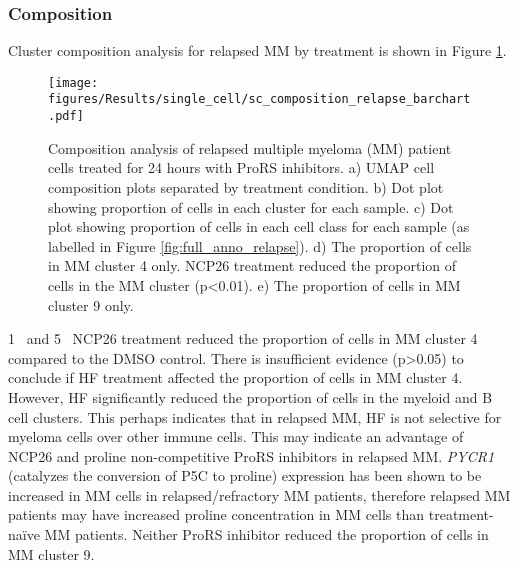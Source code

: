 \subsubsection{Composition}
Cluster composition analysis for relapsed MM by treatment is shown in Figure \ref{fig:composition_relapse}.
\begin{figure}[htb]
\centering
\texttt{[image: figures/Results/single\_cell/sc\_composition\_relapse\_barchart.pdf]}
\caption[Composition analysis- relapsed MM]{Composition analysis of relapsed multiple myeloma (MM) patient cells treated for 24 hours with ProRS inhibitors.
    a) UMAP cell composition plots separated by treatment condition.
    b) Dot plot showing proportion of cells in each cluster for each sample.
    c) Dot plot showing proportion of cells in each cell class for each sample (as labelled in Figure \ref{fig:full_anno_relapse}).
    d) The proportion of cells in MM cluster 4 only.
NCP26 treatment reduced the proportion of cells in the MM cluster (p<0.01).
    e) The proportion of cells in MM cluster 9 only.}
\label{fig:composition_relapse}
\end{figure}
1\si{\micro\Molar} and 5\si{\micro\Molar} NCP26 treatment reduced the proportion of cells in MM cluster 4 compared to the DMSO control.
There is insufficient evidence (p>0.05) to conclude if HF treatment affected the proportion of cells in MM cluster 4.
However, HF significantly reduced the proportion of cells in the myeloid and B cell clusters.
This perhaps indicates that in relapsed MM, HF is not selective for myeloma cells over other immune cells.
This may indicate an advantage of NCP26 and proline non-competitive ProRS inhibitors in relapsed MM\@.
\textit{PYCR1} (catalyzes the conversion of P5C to proline) expression has been shown to be increased in MM cells in relapsed/refractory MM patients\cite{oudaert2022pyrroline}, therefore relapsed MM patients may have increased proline concentration in MM cells than treatment-na\"ive MM patients.
Neither ProRS inhibitor reduced the proportion of cells in MM cluster 9.

